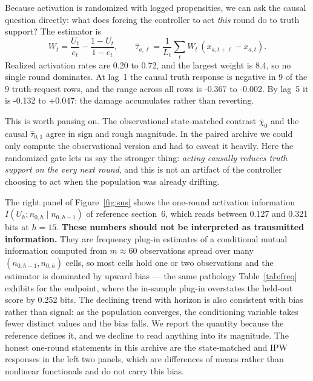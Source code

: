 \documentclass[11pt]{article}
\begin{document}
Because activation is randomized with logged propensities, we can ask the causal question
directly: what does forcing the controller to act \emph{this} round do to truth support?
The estimator is
\begin{equation}
W_t=\frac{U_t}{e_t}-\frac{1-U_t}{1-e_t},\qquad
\hat\tau_{a,\ell}=\frac1{L_\ell}\sum_{t}W_t\,(x_{a,t+\ell}-x_{a,t}).
\end{equation}
Realized activation rates are 0.20 to 0.72, and the largest
weight is 8.4, so no single round dominates. At lag~1 the causal truth response is
negative in 9 of the 9 truth-request rows, and the range across
all rows is -0.367 to -0.002. By lag~5 it is -0.132 to
+0.047: the damage accumulates rather than reverting.

This is worth pausing on. The observational state-matched contrast $\bar\chi_0$ and the
causal $\hat\tau_{0,1}$ agree in sign and rough magnitude. In the paired archive we could
only compute the observational version and had to caveat it heavily. Here the randomized
gate lets us say the stronger thing: \emph{acting causally reduces truth support on the very
next round}, and this is not an artifact of the controller choosing to act when the
population was already drifting.

The right panel of Figure~\ref{fig:sus} shows the one-round activation information
$I(U_h;n_{0,h}\mid n_{0,h-1})$ of reference section~6, which reads between 0.127 and
0.321 bits at $h=15$. \textbf{These numbers should not be interpreted as
transmitted information.} They are frequency plug-in estimates of a conditional mutual
information computed from $m\approx60$ observations spread over many
$(n_{0,h-1},n_{0,h})$ cells, so most cells hold one or two observations and the estimator is
dominated by upward bias --- the same pathology Table~\ref{tab:freq} exhibits for the
endpoint, where the in-sample plug-in overstates the held-out score by 0.252 bits.
The declining trend with horizon is also consistent with bias rather than signal: as the
population converges, the conditioning variable takes fewer distinct values and the bias
falls. We report the quantity because the reference defines it, and we decline to read
anything into its magnitude. The honest one-round statements in this archive are the
state-matched and IPW responses in the left two panels, which are differences of means
rather than nonlinear functionals and do not carry this bias.
\end{document}
